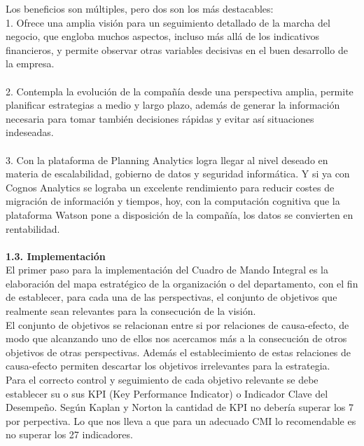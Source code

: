 \documentclass[twoside,twocolumn]{article}
\begin{document}
\begin{flushright}
\begin{itemize}
Los beneficios son múltiples, pero dos son los más destacables:\\

1. Ofrece una amplia visión para un seguimiento detallado de la marcha del negocio, que engloba muchos aspectos, incluso más allá de los indicativos financieros, y permite observar otras variables decisivas en el buen desarrollo de la empresa.\\
\textbf{}\\
2. Contempla la evolución de la compañía desde una perspectiva amplia, permite planificar estrategias a medio y largo plazo, además de generar la información necesaria para tomar también decisiones rápidas y evitar así situaciones indeseadas.\\
\textbf{}\\
3. Con la plataforma de Planning Analytics logra llegar al nivel deseado en materia de escalabilidad, gobierno de datos y seguridad informática. Y si ya con Cognos Analytics se lograba un excelente rendimiento para reducir costes de migración de información y tiempos, hoy, con la computación cognitiva que la plataforma Watson pone a disposición de la compañía, los datos se convierten en rentabilidad.\\
\textbf{}\\

\textbf{1.3.  Implementación}\\

El primer paso para la implementación del Cuadro de Mando Integral es la elaboración del mapa estratégico de la organización o del departamento, con el fin de establecer, para cada una de las perspectivas, el conjunto de objetivos que realmente sean relevantes para la consecución de la visión.\\

El conjunto de objetivos se relacionan entre si por relaciones de causa-efecto, de modo que alcanzando uno de ellos nos acercamos más a la consecución de otros objetivos de otras perspectivas. Además el establecimiento de estas relaciones de causa-efecto permiten descartar los objetivos irrelevantes para la estrategia.\\

Para el correcto control y seguimiento de cada objetivo relevante se debe establecer su o sus KPI (Key Performance Indicator) o Indicador Clave del Desempeño. Según Kaplan y Norton la cantidad de KPI no debería superar los 7 por perpectiva. Lo que nos lleva a que para un adecuado CMI lo recomendable es no superar los 27 indicadores.\\


\end{itemize}
\end{flushright}
\end{document}
